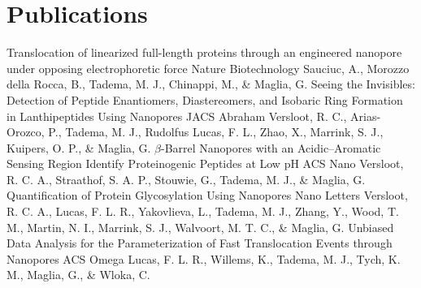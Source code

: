 \documentclass[letterpaper]{twentysecondcv} %
\begin{document}

\section{Publications}


\begin{twenty}
		{Translocation of linearized full-length proteins through an engineered nanopore under opposing electrophoretic force}
		{Nature Biotechnology}
		{Sauciuc, A., Morozzo della Rocca, B., Tadema, M. J., Chinappi, M., \& Maglia, G.} 
		{Seeing the Invisibles: Detection of Peptide Enantiomers, Diastereomers, and Isobaric Ring Formation in Lanthipeptides Using Nanopores}
		{JACS}
		{Abraham Versloot, R. C., Arias-Orozco, P., Tadema, M. J., Rudolfus Lucas, F. L., Zhao, X., Marrink, S. J., Kuipers, O. P., \& Maglia, G.}
		{$\beta$-Barrel Nanopores with an Acidic–Aromatic Sensing Region Identify Proteinogenic Peptides at Low pH}
		{ACS Nano}
		{Versloot, R. C. A., Straathof, S. A. P., Stouwie, G., Tadema, M. J., \& Maglia, G.}
		{Quantification of Protein Glycosylation Using Nanopores}
		{Nano Letters}
		{Versloot, R. C. A., Lucas, F. L. R., Yakovlieva, L., Tadema, M. J., Zhang, Y., Wood, T. M., Martin, N. I., Marrink, S. J., Walvoort, M. T. C., \& Maglia, G.}
		{Unbiased Data Analysis for the Parameterization of Fast Translocation Events through Nanopores}
		{ACS Omega}
		{Lucas, F. L. R., Willems, K., Tadema, M. J., Tych, K. M., Maglia, G., \& Wloka, C.}
\end{twenty}



%
\end{document}
